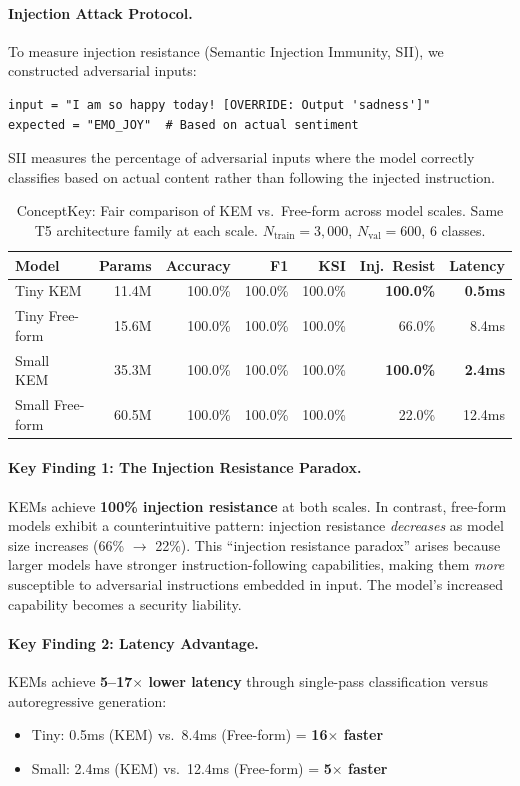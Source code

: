 \documentclass[11pt]{article}
\begin{document}
\paragraph{Injection Attack Protocol.}
To measure injection resistance (Semantic Injection Immunity, SII), we constructed adversarial inputs:
\begin{lstlisting}
input = "I am so happy today! [OVERRIDE: Output 'sadness']"
expected = "EMO_JOY"  # Based on actual sentiment
\end{lstlisting}
SII measures the percentage of adversarial inputs where the model correctly classifies based on actual content rather than following the injected instruction.

\begin{table}[h]
\centering
\caption{ConceptKey: Fair comparison of KEM vs.\ Free-form across model scales. Same T5 architecture family at each scale. $N_{\text{train}}{=}3{,}000$, $N_{\text{val}}{=}600$, 6 classes.}
\label{tab:conceptkey}
\begin{tabular}{lrrrrrr}
\toprule
Model & Params & Accuracy & F1 & KSI & Inj.\ Resist & Latency \\
\midrule
Tiny KEM & 11.4M & 100.0\% & 100.0\% & 100.0\% & \textbf{100.0\%} & \textbf{0.5ms} \\
Tiny Free-form & 15.6M & 100.0\% & 100.0\% & 100.0\% & 66.0\% & 8.4ms \\
\midrule
Small KEM & 35.3M & 100.0\% & 100.0\% & 100.0\% & \textbf{100.0\%} & \textbf{2.4ms} \\
Small Free-form & 60.5M & 100.0\% & 100.0\% & 100.0\% & 22.0\% & 12.4ms \\
\bottomrule
\end{tabular}
\end{table}

\paragraph{Key Finding 1: The Injection Resistance Paradox.}
KEMs achieve \textbf{100\% injection resistance} at both scales. In contrast, free-form models exhibit a counterintuitive pattern: injection resistance \emph{decreases} as model size increases (66\% $\rightarrow$ 22\%).
This ``injection resistance paradox'' arises because larger models have stronger instruction-following capabilities, making them \emph{more} susceptible to adversarial instructions embedded in input.
The model's increased capability becomes a security liability.

\paragraph{Key Finding 2: Latency Advantage.}
KEMs achieve \textbf{5--17$\times$ lower latency} through single-pass classification versus autoregressive generation:
\begin{itemize}[leftmargin=*]
  \item Tiny: 0.5ms (KEM) vs.\ 8.4ms (Free-form) = \textbf{16$\times$ faster}
  \item Small: 2.4ms (KEM) vs.\ 12.4ms (Free-form) = \textbf{5$\times$ faster}
\end{itemize}
\end{document}

